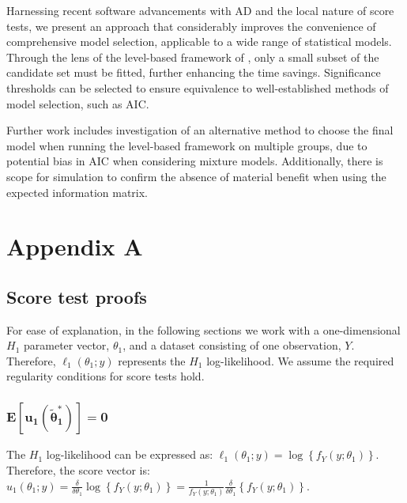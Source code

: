 \documentclass{article}
\newcommand{\thetaOneOD}{\theta_1}
\newcommand{\thetaOneTilde}{\tilde{\boldsymbol{\theta}}_1}
\newcommand{\lrbr}[1]{\left\{ #1 \right\}}
\newcommand{\llSimple}{\ell_1(\thetaOneOD; y)}
\newcommand{\pdfSimple}{f_Y (y; \thetaOneOD)}
\newcommand{\scoreSimpleCond}{u_1(\thetaOneOD; y)}
\newcommand{\deltaThetaOneOD}{\frac{\delta}{\delta \thetaOneOD}}
\begin{document}
Harnessing recent software advancements with AD and the local nature
of score tests, we present an approach that considerably improves the
convenience of comprehensive model selection,
applicable to a wide range of statistical models. Through the lens of
the level-based framework of \textcite{catchpoleMorgan1996}, only a small subset 
of the candidate set must be fitted, further enhancing the time
savings. Significance thresholds can be selected
to ensure equivalence to well-established methods of model selection,
such as AIC. 

Further work includes investigation of an alternative method to choose
the final model when running the level-based framework on multiple
groups, due to potential bias in AIC when considering mixture
models. Additionally, there is scope for simulation to confirm the absence of material
benefit when using the expected information matrix.

\appendix



\section{Appendix A}
\label{sec:appendix}

\subsection{Score test proofs}
\label{sec:score-test-proofs}

For ease of explanation, in the following sections we work with
a one-dimensional $H_1$ parameter vector, $\thetaOneOD$, and a dataset
consisting of one observation, $Y$. Therefore, $\llSimple$
represents the $H_1$ log-likelihood. We assume the required
regularity conditions for score tests hold. 

\subsubsection*{$\boldsymbol{E[\boldsymbol{u}_1(\thetaOneTilde^*)]=0}$}
\label{sec:exp-zero-proof}

The $H_1$ log-likelihood can be expressed as: $\llSimple
= \log \lrbr{\pdfSimple}$. Therefore, the score vector is:
$\scoreSimpleCond = \deltaThetaOneOD \log \lrbr{\pdfSimple} =
\frac{1}{\pdfSimple} \deltaThetaOneOD \lrbr{\pdfSimple}$.
\end{document}

